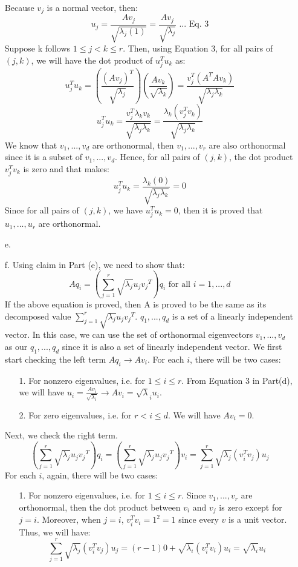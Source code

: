 \documentclass[twoside]{homework}
\begin{document}
\begin{itemize}
    Because $v_j$ is a normal vector, then:
    $$ u_j = \frac{Av_j}{\sqrt{{\lambda}_j(1)}} = \frac{Av_j}{\sqrt{{\lambda}_j}} \text{ ... Eq. 3}$$
    Suppose k follows $1\leq{j}<k\leq{r}$.
    Then, using Equation 3, for all pairs of $(j, k)$, we will have the dot product of $u_j^Tu_k$ as:
    $$ u_j^Tu_k = (\frac{(Av_j)^T}{\sqrt{{\lambda}_j}}) (\frac{Av_k}{\sqrt{{\lambda}_k}}) = \frac{v_j^T(A^TAv_k)}{\sqrt{{\lambda}_j\lambda_k}} $$
    $$ u_j^Tu_k =
    \frac{v_j^T{\lambda}_kv_k}{\sqrt{{\lambda}_j\lambda_k}} = \frac{{\lambda}_k(v_j^Tv_k)}{\sqrt{{\lambda}_j\lambda_k}} $$
    We know that $v_1, ..., v_d$ are orthonormal, then $v_1, ..., v_r$ are also orthonormal since it is a subset of $v_1, ..., v_d$. Hence, for all pairs of $(j,k)$, the dot product $v_j^Tv_k$ is zero and that makes:
    $$ u_j^Tu_k = \frac{{\lambda}_k(0)}{\sqrt{{\lambda}_j\lambda_k}} = 0$$
    Since for all pairs of $(j,k)$, we have $u_j^Tu_k = 0$, then it is proved that $u_1, ..., u_r$ are orthonormal.
    \item[e.]
    \item[f.] Using claim in Part (e), we need to show that:
    $$Aq_i=(\sum_{j=1}^r\sqrt{{\lambda}_j}u_j{v_j}^T)q_i \text{ for all } i=1,...,d$$
    If the above equation is proved, then A is proved to be the same as its decomposed value $\sum_{j=1}^r\sqrt{{\lambda}_j}u_j{v_j}^T$. $q_1, ..., q_d$ is a set of a linearly independent vector. In this case, we can use the set of orthonormal eigenvectors $v_1, ..., v_d$ as our $q_1, ..., q_d$ since it is also a set of linearly independent vector.
    \newline\newline
    We first start checking the left term $Aq_i\xrightarrow{}Av_i$. For each $i$, there will be two cases:
    \begin{itemize}
        \item[1.] For nonzero eigenvalues, i.e. for $1\leq{i}\leq{r}$. From Equation 3 in Part(d), we will have $ u_i = \frac{Av_i}{\sqrt{{\lambda}_i}} \xrightarrow{} Av_i = \sqrt{\lambda}_iu_i$.
        \item[2.] For zero eigenvalues, i.e. for $r<i\leq{d}$. We will have $ Av_i = 0$.
    \end{itemize}
    Next, we check the right term.
    $$(\sum_{j=1}^r\sqrt{{\lambda}_j}u_j{v_j}^T)q_i = (\sum_{j=1}^r\sqrt{{\lambda}_j}u_j{v_j}^T)v_i = \sum_{j=1}^r\sqrt{{\lambda}_j}(v_i^Tv_j)u_j$$
    For each $i$, again, there will be two cases:
    \begin{itemize}
        \item[1.] For nonzero eigenvalues, i.e. for $1\leq{i}\leq{r}$. Since $v_1, ..., v_r$ are orthonormal, then the dot product between $v_i$ and $v_j$ is zero except for $j=i$. Moreover, when $j=i$, $v_i^Tv_i=1^2=1$ since every $v$ is a unit vector. Thus, we will have: $$\sum_{j=1}^r\sqrt{{\lambda}_j}(v_i^Tv_j)u_j = (r-1)0 + \sqrt{\lambda_i}(v_i^Tv_i)u_i=\sqrt{\lambda_i}u_i$$

\end{itemize}
\end{itemize}
\end{document}
